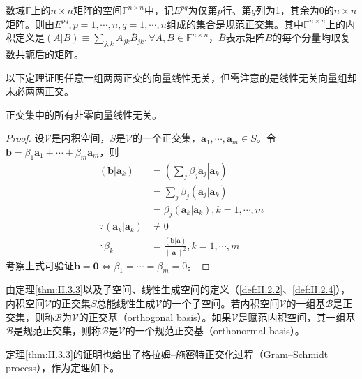 \documentclass[main.tex]{subfiles}
\begin{document}
\begin{example}\label{exp:II.3.2}\cite[“例题2.2”,p.~174]{周胜林2012线性代数}
数域$\mathbb{F}$上的$n\times n$矩阵的空间$\mathbb{F}^{n\times n}$中，记$E^{pq}$为仅第$p$行、第$q$列为1，其余为0的$n\times n$矩阵。则由$E^{pq},p=1,\cdots,n,q=1,\cdots,n$组成的集合是规范正交集。其中$\mathbb{F}^{n\times n}$上的内积定义是$\left(A|B\right)\equiv\sum_{j,k}A_{jk}\overline{B}_{jk},\forall A, B\in\mathbb{F}^{n\times n}$，$\overline{B}$表示矩阵$B$的每个分量均取复数共轭后的矩阵。
\end{example}

以下定理证明任意一组两两正交的向量线性无关，但需注意的是线性无关向量组却未必两两正交。

\begin{theorem}\label{thm:II.3.3}
正交集中的所有非零向量线性无关。
\end{theorem}
\begin{proof}
设$\mathcal{V}$是内积空间，$S$是$\mathcal{V}$的一个正交集，$\mathbf{a}_1,\cdots,\mathbf{a}_m\in S$。令$\mathbf{b}=\beta_1\mathbf{a}_1+\cdots+\beta_m\mathbf{a}_m$，则
\begin{align*}
\left(\mathbf{b}|\mathbf{a}_k\right)&=\left(\left.\sum_j\beta_j\mathbf{a}_j\right|\left.\mathbf{a}_k\right.\right)\\
&=\sum_j\beta_j\left(\mathbf{a}_j|\mathbf{a}_k\right)\\
&=\beta_j\left(\mathbf{a}_k|\mathbf{a}_k\right),k=1,\cdots,m\\
\because \left(\mathbf{a}_k|\mathbf{a}_k\right)&\neq 0\\
\therefore \beta_k&=\frac{\left(\mathbf{b}|\mathbf{a}\right)}{\left\|\mathbf{a}\right\|^2},k=1,\cdots,m
\end{align*}
考察上式可验证$\mathbf{b}=\mathbf{0}\Leftrightarrow\beta_1=\cdots=\beta_m=0$。
\end{proof}

由定理\ref{thm:II.3.3}以及子空间、线性生成空间的定义（\ref{def:II.2.2}、\ref{def:II.2.4}），内积空间$\mathcal{V}$的正交集$S$总能线性生成$\mathcal{V}$的一个子空间。若内积空间$\mathcal{V}$的一组基$\mathcal{B}$是正交集，则称$\mathcal{B}$为$\mathcal{V}$的正交基（orthogonal basis）。如果$\mathcal{V}$是赋范内积空间，其一组基$\mathcal{B}$是规范正交集，则称$\mathcal{B}$是$\mathcal{V}$的一个规范正交基（orthonormal basis）。

定理\ref{thm:II.3.3}的证明也给出了格拉姆--施密特正交化过程（Gram--Schmidt process），作为定理如下。
\end{document}
